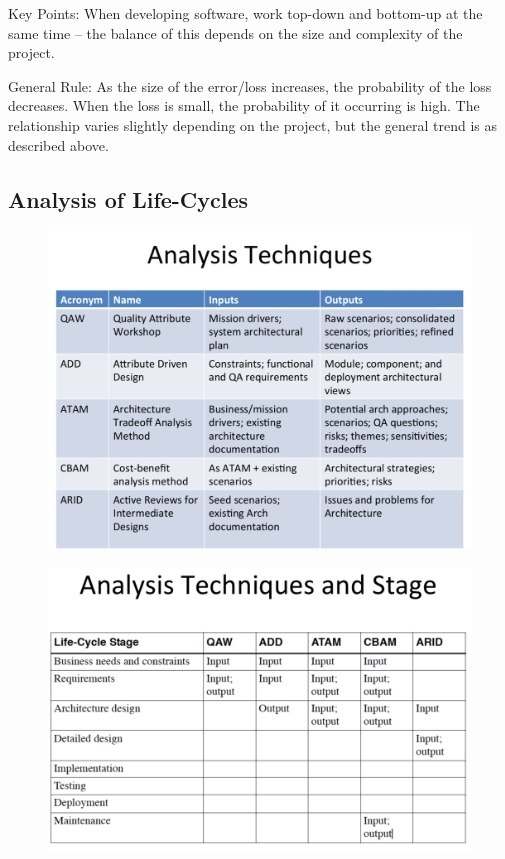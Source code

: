 \documentclass[a4paper]{article}
\begin{document}
Key Points:
When developing software, work top-down and bottom-up at the same time – the balance of this depends on the size and complexity of the project.

General Rule:
As the size of the error/loss increases, the probability of the loss decreases. When the loss is small, the probability of it occurring is high. The relationship varies slightly depending on the project, but the general trend is as described above.

\subsection{Analysis of Life-Cycles}
\begin{figure}[H]
\begin{center} 
    \includegraphics[scale=0.3]{images/Analysis1.pdf}
\end{center}
\end{figure}

\begin{figure}[H]
\begin{center} 
    \includegraphics[scale=0.3]{images/Analysis2.pdf}
\end{center}
\end{figure}
\end{document}
